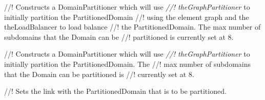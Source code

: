 //! Constructs a DomainPartitioner which will use {\em
//! theGraphPartitioner} to initially partition the PartitionedDomain
//! using the element graph and the \p theLoadBalancer to load balance 
//! the PartitionedDomain. The max number of subdomains that the Domain can be 
//! partitioned is currently set at 8.

//! Constructs a DomainPartitioner which will use {\em
//! theGraphPartitioner} to initially partition the PartitionedDomain. The
//! max number of subdomains that the Domain can be partitioned is
//! currently set at 8. 



//! Sets the link with the PartitionedDomain that is to be partitioned.

